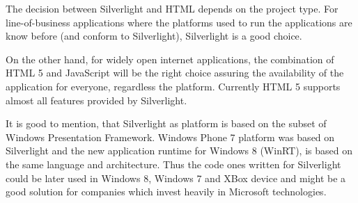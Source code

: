 The decision between Silverlight and HTML depends on the project type. For line-of-business applications where the platforms used to run the applications are know before (and conform to Silverlight), Silverlight is a good choice.

On the other hand, for widely open internet applications, the combination of HTML 5 and JavaScript will be the right choice assuring the availability of the application for everyone, regardless the platform. Currently HTML 5 supports almost all features provided by Silverlight.

It is good to mention, that Silverlight as platform is based on the subset of Windows Presentation Framework. Windows Phone 7 platform was based on Silverlight and the new application runtime for Windows 8 (WinRT), is based on the same language and architecture. Thus the code ones written for Silverlight could be later used in Windows 8, Windows 7 and XBox device and might be a good solution for companies which invest heavily in Microsoft technologies.